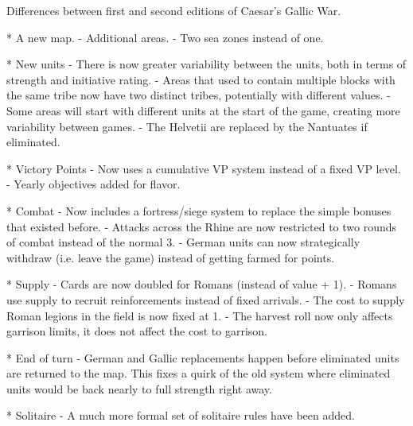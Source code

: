 Differences between first and second editions of Caesar's Gallic War.

* A new map.
  - Additional areas.
  - Two sea zones instead of one.
  
* New units
  - There is now greater variability between the units, both in terms of strength and initiative rating.
  - Areas that used to contain multiple blocks with the same tribe now have two distinct tribes, potentially with different values.
  - Some areas will start with different units at the start of the game, creating more variability between games.
  - The Helvetii are replaced by the Nantuates if eliminated. 
  
* Victory Points
  - Now uses a cumulative VP system instead of a fixed VP level.
  - Yearly objectives added for flavor.
  
* Combat
  - Now includes a fortress/siege system to replace the simple bonuses that existed before.
  - Attacks across the Rhine are now restricted to two rounds of combat instead of the normal 3.
  - German units can now strategically withdraw (i.e. leave the game) instead of getting farmed for points.
  
* Supply
  - Cards are now doubled for Romans (instead of value + 1).
  - Romans use supply to recruit reinforcements instead of fixed arrivals.
  - The cost to supply Roman legions in the field is now fixed at 1.
  - The harvest roll now only affects garrison limits, it does not affect the cost to garrison.
  
* End of turn
  - German and Gallic replacements happen before eliminated units are returned to the map. This fixes a quirk of the old system where eliminated units would be back nearly to full strength right away.
  
* Solitaire
  - A much more formal set of solitaire rules have been added.